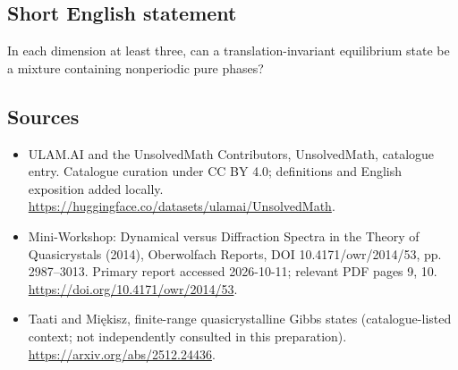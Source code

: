 \documentclass[11pt]{article}
\begin{document}
\subsection{Short English statement}
In each dimension at least three, can a translation-invariant equilibrium state be a mixture containing nonperiodic pure phases?
\subsection{Sources}
\begin{itemize}
\item[\hypertarget{source:statement:1}{S1}] ULAM.AI and the UnsolvedMath Contributors, UnsolvedMath, catalogue entry. Catalogue curation under CC BY 4.0; definitions and English exposition added locally.
\url{https://huggingface.co/datasets/ulamai/UnsolvedMath}.
\item[\hypertarget{source:statement:2}{S2}] Mini-Workshop: Dynamical versus Diffraction Spectra in the Theory of Quasicrystals (2014), Oberwolfach Reports, DOI 10.4171/owr/2014/53, pp. 2987--3013. Primary report accessed 2026-10-11; relevant PDF pages 9, 10.
\url{https://doi.org/10.4171/owr/2014/53}.
\item[\hypertarget{source:statement:3}{S3}] Taati and Miękisz, finite-range quasicrystalline Gibbs states (catalogue-listed context; not independently consulted in this preparation).
\url{https://arxiv.org/abs/2512.24436}.
\end{itemize}
\label{end:statement}
\end{document}
